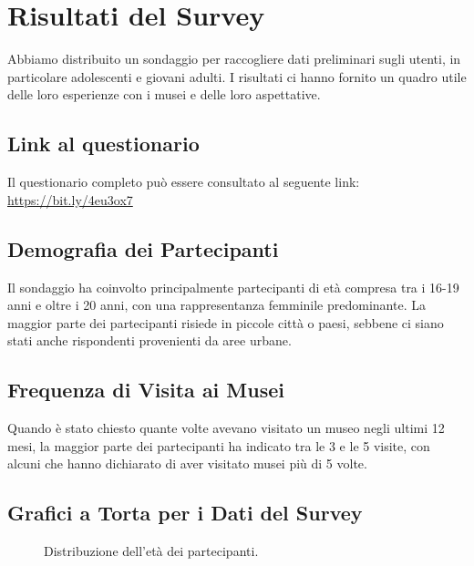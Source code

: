 \documentclass{article}
\begin{document}
\section{Risultati del Survey}

Abbiamo distribuito un sondaggio per raccogliere dati preliminari sugli utenti, in particolare adolescenti e giovani adulti. I risultati ci hanno fornito un quadro utile delle loro esperienze con i musei e delle loro aspettative.

\subsection{Link al questionario}

Il questionario completo può essere consultato al seguente link: \url{https://bit.ly/4eu3ox7}

\subsection{Demografia dei Partecipanti}

Il sondaggio ha coinvolto principalmente partecipanti di età compresa tra i 16-19 anni e oltre i 20 anni, con una rappresentanza femminile predominante. La maggior parte dei partecipanti risiede in piccole città o paesi, sebbene ci siano stati anche rispondenti provenienti da aree urbane.

\subsection{Frequenza di Visita ai Musei}

Quando è stato chiesto quante volte avevano visitato un museo negli ultimi 12 mesi, la maggior parte dei partecipanti ha indicato tra le 3 e le 5 visite, con alcuni che hanno dichiarato di aver visitato musei più di 5 volte.

\subsection{Grafici a Torta per i Dati del Survey}

\begin{figure}[h]
    \centering
    \caption{Distribuzione dell'età dei partecipanti.}
\end{figure}
\end{document}
